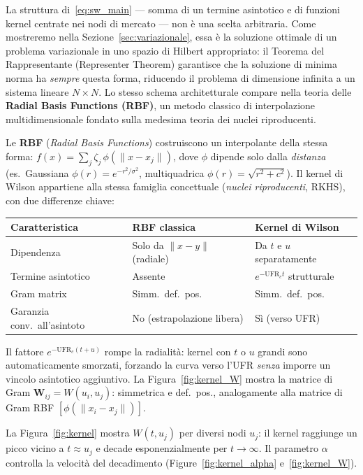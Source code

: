\documentclass[11pt,a4paper]{article}
\theoremstyle{plain}
\theoremstyle{definition}
\theoremstyle{remark}
\newcommand{\UFR}{\mathrm{UFR}}
\newcommand{\Wmat}{\mathbf{W}}
\begin{document}
La struttura di~\eqref{eq:sw_main} --- somma di un termine asintotico e di
funzioni kernel centrate nei nodi di mercato --- non \`e una scelta arbitraria.
Come mostreremo nella Sezione~\ref{sec:variazionale}, essa \`e la soluzione ottimale
di un problema variazionale in uno spazio di Hilbert appropriato: il Teorema del
Rappresentante (Representer Theorem) garantisce che la soluzione di minima norma
ha \emph{sempre} questa forma, riducendo il problema di dimensione infinita a un
sistema lineare $N \times N$.
Lo stesso schema architetturale compare nella teoria delle
\textbf{Radial Basis Functions (RBF)}, un metodo classico di interpolazione
multidimensionale fondato sulla medesima teoria dei nuclei riproducenti.

\begin{keybox}
Le \textbf{RBF} (\emph{Radial Basis Functions}) costruiscono un interpolante della
stessa forma: $f(x) = \sum_j \zeta_j\,\phi(\|x-x_j\|)$, dove $\phi$ dipende
solo dalla \emph{distanza} (es.~Gaussiana $\phi(r)=e^{-r^2/\sigma^2}$, multiquadrica
$\phi(r)=\sqrt{r^2+c^2}$). Il kernel di Wilson appartiene alla stessa famiglia
concettuale (\emph{nuclei riproducenti}, RKHS), con due differenze chiave:
\begin{center}\small
\renewcommand{\arraystretch}{1.2}
\begin{tabular}{lll}
\toprule
\textbf{Caratteristica} & \textbf{RBF classica} & \textbf{Kernel di Wilson}\\
\midrule
Dipendenza & Solo da $\|x-y\|$ (radiale) & Da $t$ e $u$ separatamente\\
Termine asintotico & Assente & $e^{-\UFR_c t}$ strutturale\\
Gram matrix & Simm.\ def.\ pos. & Simm.\ def.\ pos.\\
Garanzia conv.\ all'asintoto & No (estrapolazione libera) & S\`i (verso UFR)\\
\bottomrule
\end{tabular}
\end{center}
Il fattore $e^{-\UFR_c(t+u)}$ rompe la radialit\`a: kernel con $t$ o $u$
grandi sono automaticamente smorzati, forzando la curva verso l'UFR
\emph{senza} imporre un vincolo asintotico aggiuntivo. La Figura~\ref{fig:kernel_W}
mostra la matrice di Gram $\Wmat_{ij}=W(u_i,u_j)$: simmetrica e def.\ pos.,
analogamente alla matrice di Gram RBF $[\phi(\|x_i-x_j\|)]$.
\end{keybox}

La Figura~\ref{fig:kernel} mostra $W(t,u_j)$ per diversi nodi $u_j$: il kernel
raggiunge un picco vicino a $t \approx u_j$ e decade esponenzialmente per
$t\to\infty$. Il parametro $\alpha$ controlla la velocit\`a del decadimento
(Figure~\ref{fig:kernel_alpha} e~\ref{fig:kernel_W}).
\end{document}
